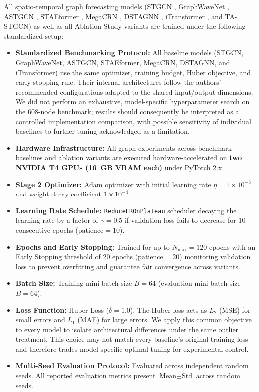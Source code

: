 \documentclass[journal,twocolumn]{IEEEtran}
\begin{document}
All spatio-temporal graph forecasting models (STGCN \cite{stgcn}, GraphWaveNet \cite{wavenet}, ASTGCN \cite{astgcn}, STAEformer \cite{staeformer}, MegaCRN \cite{megacrn}, DSTAGNN \cite{dstagnn}, iTransformer \cite{itransformer}, and TA-STGCN) as well as all Ablation Study variants are trained under the following standardized setup:
\begin{itemize}
    \item \textbf{Standardized Benchmarking Protocol:} All baseline models (STGCN, GraphWaveNet, ASTGCN, STAEformer, MegaCRN, DSTAGNN, and iTransformer) use the same optimizer, training budget, Huber objective, and early-stopping rule. Their internal architectures follow the authors' recommended configurations adapted to the shared input/output dimensions. We did not perform an exhaustive, model-specific hyperparameter search on the 608-node benchmark; results should consequently be interpreted as a controlled implementation comparison, with possible sensitivity of individual baselines to further tuning acknowledged as a limitation.
    \item \textbf{Hardware Infrastructure:} All graph experiments across benchmark baselines and ablation variants are executed hardware-accelerated on \textbf{two NVIDIA T4 GPUs (16~GB VRAM each)} under PyTorch 2.x.
    \item \textbf{Stage 2 Optimizer:} Adam optimizer \cite{adam} with initial learning rate $\eta = 1 \times 10^{-3}$ and weight decay coefficient $1 \times 10^{-4}$.
    \item \textbf{Learning Rate Schedule:} \texttt{ReduceLROnPlateau} scheduler decaying the learning rate by a factor of $\gamma = 0.5$ if validation loss fails to decrease for 10 consecutive epochs ($\text{patience} = 10$).
    \item \textbf{Epochs and Early Stopping:} Trained for up to $N_{\text{max}} = 120$ epochs with an Early Stopping threshold of 20 epochs ($\text{patience} = 20$) monitoring validation loss to prevent overfitting and guarantee fair convergence across variants.
    \item \textbf{Batch Size:} Training mini-batch size $B = 64$ (evaluation mini-batch size $B = 64$).
    \item \textbf{Loss Function:} Huber Loss \cite{huber} ($\delta = 1.0$). The Huber loss acts as $L_2$ (MSE) for small errors and $L_1$ (MAE) for large errors. We apply this common objective to every model to isolate architectural differences under the same outlier treatment. This choice may not match every baseline's original training loss and therefore trades model-specific optimal tuning for experimental control.
    \item \textbf{Multi-Seed Evaluation Protocol:} Evaluated across independent random seeds. All reported evaluation metrics present $\text{Mean} \pm \text{Std}$ across random seeds.
\end{itemize}
\end{document}

